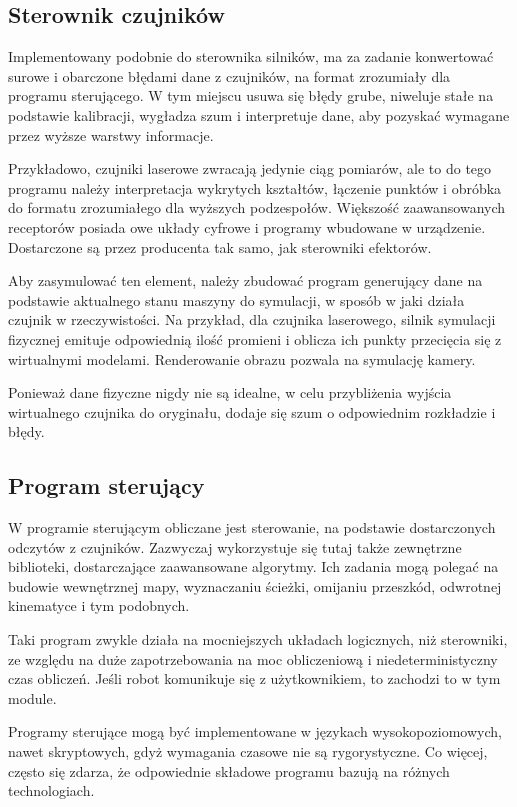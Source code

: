 	\subsection{Sterownik czujników}
		Implementowany podobnie do sterownika silników, ma za zadanie konwertować surowe i obarczone błędami dane z czujników, na format zrozumiały dla programu sterującego.
		W tym miejscu usuwa się błędy grube, niweluje stałe na podstawie kalibracji, wygładza szum i interpretuje dane, aby pozyskać wymagane przez wyższe warstwy informacje.

		Przykładowo, czujniki laserowe zwracają jedynie ciąg pomiarów, ale to do tego programu należy interpretacja wykrytych kształtów, łączenie punktów i obróbka do formatu zrozumiałego dla wyższych podzespołów.
		Większość zaawansowanych receptorów posiada owe układy cyfrowe i programy wbudowane w urządzenie.
		Dostarczone są przez producenta tak samo, jak sterowniki efektorów.
		
		Aby zasymulować ten element, należy zbudować program generujący dane na podstawie aktualnego stanu maszyny do symulacji, w sposób w jaki działa czujnik w rzeczywistości.
		Na przykład, dla czujnika laserowego, silnik symulacji fizycznej emituje odpowiednią ilość promieni i oblicza ich punkty przecięcia się z wirtualnymi modelami.
		Renderowanie obrazu pozwala na symulację kamery.

		Ponieważ dane fizyczne nigdy nie są idealne, w celu przybliżenia wyjścia wirtualnego czujnika do oryginału, dodaje się szum o odpowiednim rozkładzie i błędy.

	\subsection{Program sterujący}
		W programie sterującym obliczane jest sterowanie, na podstawie dostarczonych odczytów z czujników.
		Zazwyczaj wykorzystuje się tutaj także zewnętrzne biblioteki, dostarczające zaawansowane algorytmy.
		Ich zadania mogą polegać na budowie wewnętrznej mapy, wyznaczaniu ścieżki, omijaniu przeszkód, odwrotnej kinematyce i tym podobnych.

		Taki program zwykle działa na mocniejszych układach logicznych, niż sterowniki, ze względu na duże zapotrzebowania na moc obliczeniową
		i niedeterministyczny czas obliczeń.
		Jeśli robot komunikuje się z użytkownikiem, to zachodzi to w tym module. 

		Programy sterujące mogą być implementowane w językach wysokopoziomowych, nawet skryptowych, gdyż wymagania czasowe nie są rygorystyczne.
		Co więcej, często się zdarza, że odpowiednie składowe programu bazują na różnych technologiach.


